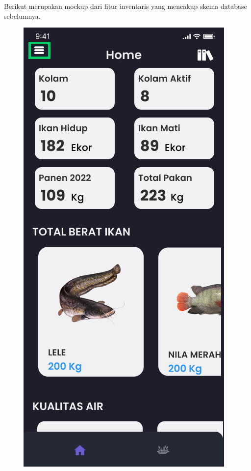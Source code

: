\begin{enumerate}
\begin{enumerate}
		Berikut merupakan mockup dari fitur inventaris yang mencakup skema database sebelumnya.

		\begin{figure}[H]
			  \includegraphics[width=\linewidth]{gambar/sprint1/mockup_dashboard.png}

\end{figure}
\end{enumerate}
\end{enumerate}
